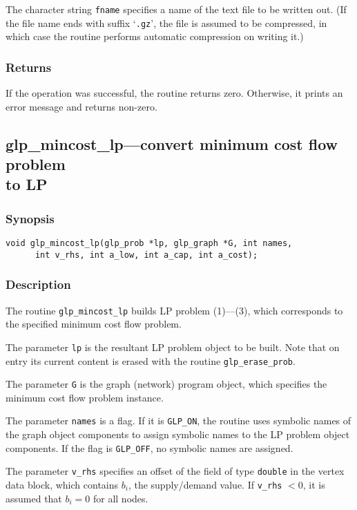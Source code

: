 \documentclass[dvipdfm,11pt]{report}
\begin{document}
The character string \verb|fname| specifies a name of the text file to
be written out. (If the file name ends with suffix `\verb|.gz|', the
file is assumed to be compressed, in which case the routine performs
automatic compression on writing it.)

\subsubsection*{Returns}

If the operation was successful, the routine returns zero. Otherwise,
it prints an error message and returns non-zero.

\newpage

\subsection{glp\_mincost\_lp---convert minimum cost flow problem\\to LP}

\subsubsection*{Synopsis}

\begin{verbatim}
void glp_mincost_lp(glp_prob *lp, glp_graph *G, int names,
      int v_rhs, int a_low, int a_cap, int a_cost);
\end{verbatim}

\subsubsection*{Description}

The routine \verb|glp_mincost_lp| builds LP problem (1)---(3), which
corresponds to the specified minimum cost flow problem.

The parameter \verb|lp| is the resultant LP problem object to be built.
Note that on entry its current content is erased with the routine
\verb|glp_erase_prob|.

The parameter \verb|G| is the graph (network) program object, which
specifies the minimum cost flow problem instance.

The parameter \verb|names| is a flag. If it is \verb|GLP_ON|, the
routine uses symbolic names of the graph object components to assign
symbolic names to the LP problem object components. If the flag is
\verb|GLP_OFF|, no symbolic names are assigned.

The parameter \verb|v_rhs| specifies an offset of the field of type
\verb|double| in the vertex data block, which contains $b_i$, the
supply/demand value. If \verb|v_rhs| $<0$, it is assumed that $b_i=0$
for all nodes.
\end{document}
